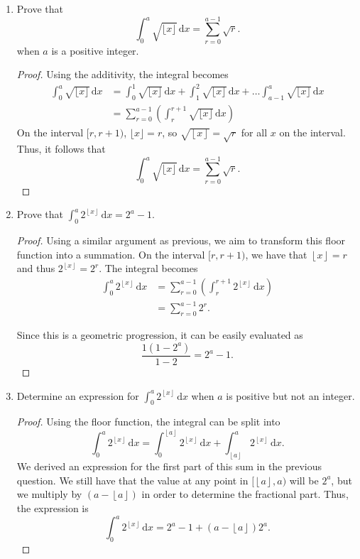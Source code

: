 \documentclass[10pt]{article}
\theoremstyle{definition}
\theoremstyle{remark}
\newcommand{\dd}{\mathrm{d}}
\newcommand{\floor}[1]{\left\lfloor #1 \right\rfloor}
\begin{document}
\begin{enumerate}[label=(\roman*)]
    \item Prove that \[ \int_0^a \sqrt{\lfloor x\rfloor} \,\dd x = \sum ^{a - 1}_{r = 0} \sqrt{r}. \]
        when $a$ is a positive integer. 
        \begin{proof}
            Using the additivity, the integral becomes 
            \begin{align*}
                \int^a_0 \sqrt{\lfloor x\rfloor} \,\dd x &=
                \int^1_0 \sqrt{\lfloor x\rfloor} \,\dd x + \int^2_1 \sqrt{\lfloor x\rfloor} \,\dd x + \ldots \int^a_{a-1} \sqrt{\lfloor x\rfloor} \,\dd x \\
                                                         &= \sum_{r = 0}^{a - 1} \left( \int_{r}^{r + 1} \sqrt{\lfloor x\rfloor} \,\dd x \right)
            \end{align*}
            On the interval $[r, r+1)$, $\lfloor x \rfloor = r$, so
            $\sqrt{\floor{x}} = \sqrt{r}$ for all $x$ on the interval.
            Thus, it follows that
            \[  \int_0^a \sqrt{\lfloor x\rfloor} \,\dd x = \sum ^{a - 1}_{r =
            0} \sqrt{r}. \]
        \end{proof}
    \item Prove that $\int_0^a 2^{\floor{x}} \, \dd x = 2^a - 1$. 
        \begin{proof}
            Using a similar argument as previous, we aim to transform this floor
            function into a summation. 
            On the interval $[r, r+1)$, we have that $\floor{x} = r$ and thus 
            $2^{\floor{x}} = 2^r$. 
            The integral becomes 
            \begin{align*}
                \int_0^a 2^{\floor{x}} \, \dd x &= \sum_{r = 0}^{a - 1} \left( \int_r^{r+1} 2^{\floor{x}} \, \dd x\right) \\
                                                &= \sum_{r = 0}^{a - 1} 2^r. 
            \end{align*}

            Since this is a geometric progression, it can be easily evaluated as
            \[ \frac{1(1 - 2^a)}{1 - 2} = 2^a - 1. \] 
        \end{proof}

    \item Determine an expression for $\int_0^a 2^{\floor{x}} \, \dd x $ when
        $a$ is positive but not an integer.
        \begin{proof}
            Using the floor function, the integral can be split into 
            \[ \int_0^a 2^{\floor{x}} \, \dd x = \int_0^{\floor{a}} 2^{\floor{x}} \, \dd x + \int_{\floor{a}}^{a} 2^{\floor{x}} \, \dd x. \]
            We derived an expression for the first part of this sum in the previous
            question. We still have that the value at any point in $[\floor{a}, a)$
            will be $2^a$, but we multiply by $(a - \floor{a})$ in order to determine 
            the fractional part. Thus, the expression is
            \[ \int_0^a 2^{\floor{x}} \, \dd x  = 2^a - 1 + (a - \floor{a})2^a. \]
        \end{proof}
\end{enumerate}
\end{document}
